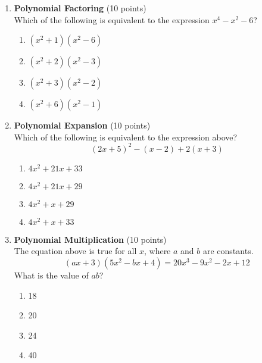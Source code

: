 \begin{enumerate}
  \item \textbf{Polynomial Factoring} (10 points)\\
  Which of the following is equivalent to the expression $x^{4}-x^{2}-6$?
  \begin{enumerate}[label=(\Alph*)]
    \item $\left(x^{2}+1\right)\left(x^{2}-6\right)$
    \item $\left(x^{2}+2\right)\left(x^{2}-3\right)$
    \item $\left(x^{2}+3\right)\left(x^{2}-2\right)$
    \item $\left(x^{2}+6\right)\left(x^{2}-1\right)$
  \end{enumerate}
  \begin{subanswer}
  \end{subanswer}

  \item \textbf{Polynomial Expansion} (10 points)\\
  Which of the following is equivalent to the expression above?
  \[
  (2 x+5)^{2}-(x-2)+2(x+3)
  \]
  \begin{enumerate}[label=(\Alph*)]
    \item $4 x^{2}+21 x+33$
    \item $4 x^{2}+21 x+29$
    \item $4 x^{2}+x+29$
    \item $4 x^{2}+x+33$
  \end{enumerate}
  \begin{subanswer}
  \end{subanswer}

  \newpage

  \item \textbf{Polynomial Multiplication} (10 points)\\
  The equation above is true for all $x$, where $a$ and $b$ are constants.
  \[
  (a x+3)\left(5 x^{2}-b x+4\right)=20 x^{3}-9 x^{2}-2 x+12
  \]
  What is the value of $a b$?
  \begin{enumerate}[label=(\Alph*)]
    \item 18
    \item 20
    \item 24
    \item 40
  \end{enumerate}
  \begin{subanswer}
  \end{subanswer}


\end{enumerate}
